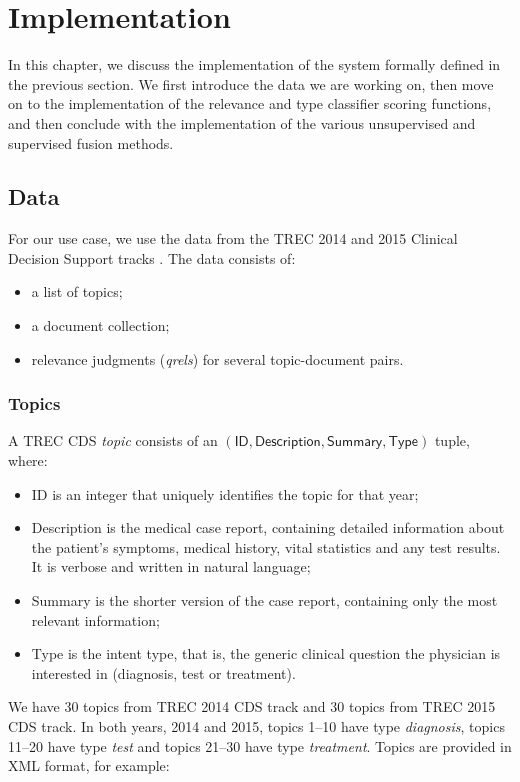 \chapter{Implementation}\label{impl}

In this chapter, we discuss the implementation of the system formally defined in the previous section. We first
introduce the data we are working on, then move on to the implementation of the relevance and type classifier scoring functions,
and then conclude with the implementation of the various unsupervised and supervised fusion methods.

\section{Data}
For our use case, we use the data from the TREC 2014 and 2015 Clinical Decision Support tracks \cite{trec}. The data consists of:
\begin{itemize}
 \item a list of topics;
 \item a document collection;
 \item relevance judgments (\emph{qrels}) for several topic-document pairs.
\end{itemize}

\subsection{Topics}
A TREC CDS \emph{topic} consists of an $(\textsf{ID}, \textsf{Description}, \textsf{Summary}, \textsf{Type})$ tuple, where:
\begin{itemize}
 \item \textsf{ID} is an integer that uniquely identifies the topic for that year;
 \item \textsf{Description} is the medical case report, containing detailed information about
 the patient's symptoms, medical history, vital statistics and any test results. It is verbose and written in natural language;
 \item \textsf{Summary} is the shorter version of the case report, containing only the most relevant information;
 \item \textsf{Type} is the intent type, that is, the generic clinical question the physician is interested in
  (diagnosis, test or treatment).
\end{itemize}

We have 30 topics from TREC 2014 CDS track and 30 topics from TREC 2015 CDS track.
In both years, 2014 and 2015, topics 1--10 have type \emph{diagnosis}, topics 11--20 have type \emph{test}
and topics 21--30 have type \emph{treatment}.
Topics are provided in XML format, for example:

